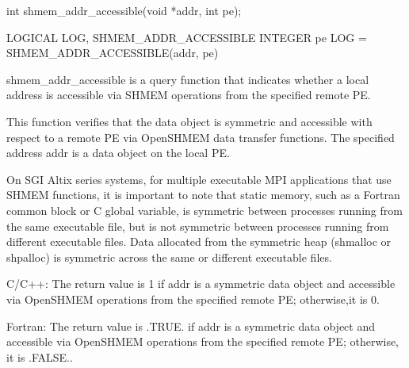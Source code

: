 
\synC
	  int shmem\_addr\_accessible(void *addr, int pe);

\synF
	  LOGICAL LOG, SHMEM\_ADDR\_ACCESSIBLE
	  INTEGER pe
	  LOG = SHMEM\_ADDR\_ACCESSIBLE(addr, pe)



{
       shmem\_addr\_accessible  is  a  query  function  that indicates whether a
       local address is accessible via SHMEM  operations  from	the  specified
       remote PE.

       This function verifies that the data object is symmetric and accessible
       with respect to a remote PE via OpenSHMEM  data  transfer  functions.   The
       specified address addr is a data object on the local PE.

       On  SGI	Altix series systems, for multiple executable MPI applications
       that use SHMEM functions, it is important to note that  static  memory,
       such  as	 a  Fortran  common  block  or C global variable, is symmetric
       between processes running from the same executable  file,  but  is  not
       symmetric  between  processes  running from different executable files.
       Data allocated from  the	 symmetric  heap  (shmalloc  or	 shpalloc)  is
       symmetric across the same or different executable files.
}

{
		\desTB{}
		{
				\cRow{}{}
		}
		{		
				C/C++: The  return value is 1 if addr is a symmetric data object and
				 accessible via OpenSHMEM operations from the specified remote PE;
				 otherwise,it is 0.

				Fortran: The return value is .TRUE. if addr is a symmetric data object
				 and accessible via OpenSHMEM operations from the specified remote
				 PE; otherwise, it is .FALSE..
		}
}

{}

\exampleB{
	\exampleITEM
					{}
					{}
					{}
}
\eAPI
